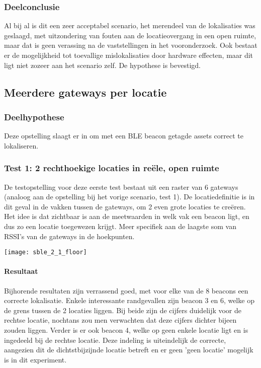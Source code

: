 \subsubsection{Deelconclusie}
Al bij al is dit een zeer acceptabel scenario, het merendeel van de lokalisaties was geslaagd, met uitzondering van fouten aan de locatieovergang in een open ruimte, maar dat is geen verassing na de vaststellingen in het vooronderzoek. Ook bestaat er de mogelijkheid tot toevallige mislokalisaties door hardware effecten, maar dit ligt niet zozeer aan het scenario zelf. De hypothese is bevestigd.

\subsection{Meerdere gateways per locatie}
\subsubsection{Deelhypothese}
Deze opstelling slaagt er in om met een BLE beacon getagde assets correct te lokaliseren.

\subsubsection{Test 1: 2 rechthoekige locaties in reële, open ruimte}
\begin{minipage}{0.55\textwidth}
De testopstelling voor deze eerste test bestaat uit een raster van 6 gateways (analoog aan de opstelling bij het vorige scenario, test 1). De locatiedefinitie is in dit geval in de vakken tussen de gateways, om 2 even grote locaties te creëren. Het idee is dat zichtbaar is aan de meetwaarden in welk vak een beacon ligt, en dus zo een locatie toegewezen krijgt. Meer specifiek aan de laagste som van RSSI's van de gateways in de hoekpunten. 
\end{minipage}
\hfill
\begin{minipage}{0.42\textwidth}
	\texttt{[image: sble\_2\_1\_floor]}
	\label{fig:ond-ble-static-2-1-ops}
\end{minipage}

\paragraph{Resultaat}
Bijhorende resultaten zijn verrassend goed, met voor elke van de 8 beacons een correcte lokalisatie. Enkele interessante randgevallen zijn beacon 3 en 6, welke op de grens tussen de 2 locaties liggen. Bij beide zijn de cijfers duidelijk voor de rechtse locatie, nochtans zou men verwachten dat deze cijfers dichter bijeen zouden liggen. Verder is er ook beacon 4, welke op geen enkele locatie ligt en is ingedeeld bij de rechtse locatie. Deze indeling is uiteindelijk de correcte, aangezien dit de dichtstbijzijnde locatie betreft en er geen 'geen locatie' mogelijk is in dit experiment. 

